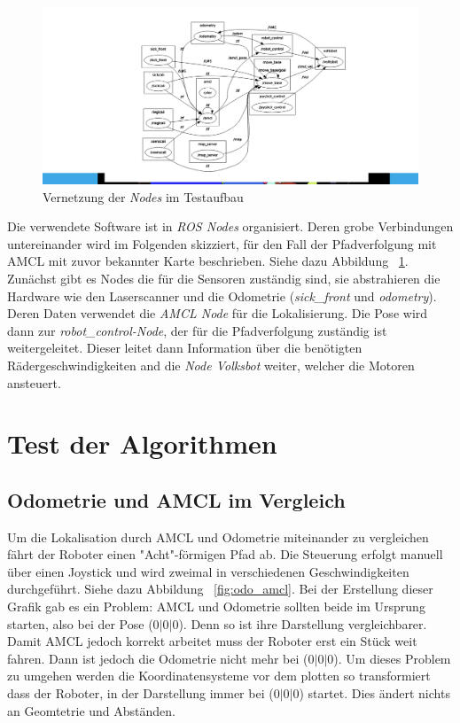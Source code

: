 \documentclass[11pt,a4paper]{article}
\begin{document}
{{	\begin{figure}[h]
		\includegraphics[trim=9cm 1cm 7cm 1cm , clip= true,width=\textwidth]{pictures/node_graph.png}
		\caption{Vernetzung der \textit{Nodes} im Testaufbau \label{fig:nodes}}
	\end{figure}
	Die verwendete Software ist in \textit{ROS Nodes} organisiert. Deren grobe Verbindungen untereinander wird im Folgenden skizziert, f\"ur den Fall der Pfadverfolgung mit AMCL mit zuvor bekannter Karte beschrieben. Siehe dazu Abbildung ~\ref{fig:nodes}. 
	\\
	Zun\"achst gibt es Nodes die f\"ur die Sensoren zust\"andig sind, sie abstrahieren die Hardware wie den Laserscanner und die Odometrie (\textit{sick\_front} und \textit{odometry}). Deren Daten verwendet die \textit{AMCL Node} f\"ur die Lokalisierung. Die Pose wird dann zur \textit{robot\_control-Node}, der f\"ur die Pfadverfolgung zust\"andig ist weitergeleitet. Dieser leitet dann Information über die ben\"otigten R\"adergeschwindigkeiten and die \textit{Node Volksbot} weiter, welcher die Motoren ansteuert.
	
} 

\section{Test der Algorithmen} 
\subsection{Odometrie und AMCL im Vergleich}




Um die Lokalisation durch AMCL und Odometrie miteinander zu vergleichen f\"ahrt der Roboter einen "Acht"-f\"ormigen Pfad ab. Die Steuerung erfolgt manuell \"uber einen Joystick und wird zweimal in verschiedenen Geschwindigkeiten durchgef\"uhrt. Siehe dazu Abbildung ~\ref{fig:odo_amcl}. Bei der Erstellung dieser Grafik gab es ein Problem: AMCL und Odometrie sollten beide im Ursprung starten, also bei der Pose (0$|$0$|$0). Denn so ist ihre Darstellung vergleichbarer. Damit AMCL jedoch korrekt arbeitet muss der Roboter erst ein Stück weit fahren. Dann ist jedoch die Odometrie nicht mehr bei (0$|$0$|$0). Um dieses Problem zu umgehen werden die Koordinatensysteme vor dem plotten so transformiert dass der Roboter, in der Darstellung immer bei (0$|$0$|$0) startet. Dies \"andert nichts an Geomtetrie und Abst\"anden.    


}
\end{document}

